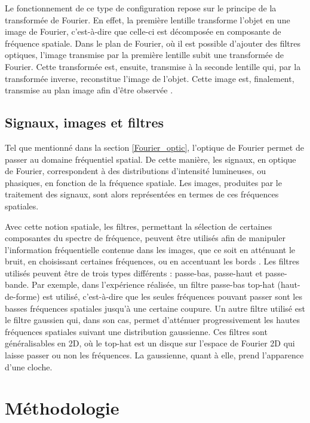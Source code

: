 \documentclass[11pt,letterpaper]{article}
\begin{document}
Le fonctionnement de ce type de configuration repose sur le principe de la transformée de Fourier. En effet, la première lentille transforme l'objet en une image de Fourier, c'est-à-dire que celle-ci est décomposée en composante de fréquence spatiale. Dans le plan de Fourier, où il est possible d'ajouter des filtres optiques, l'image transmise par la première lentille subit une transformée de Fourier. Cette transformée est, ensuite, transmise à la seconde lentille qui, par la transformée inverse, reconstitue l'image de l'objet. Cette image est, finalement, transmise au plan image afin d'être observée \cite{noauthor_fourier_2012}.

\subsection{Signaux, images et filtres}
Tel que mentionné dans la section \ref{Fourier_optic}, l'optique de Fourier permet de passer au domaine fréquentiel spatial. De cette manière, les signaux, en optique de Fourier, correspondent à des distributions d'intensité lumineuses, ou phasiques, en fonction de la fréquence spatiale. Les images, produites par le traitement des signaux, sont alors représentées en termes de ces fréquences spatiales.

Avec cette notion spatiale, les filtres, permettant la sélection de certaines composantes du spectre de fréquence, peuvent être utilisés afin de manipuler l'information fréquentielle contenue dans les images, que ce soit en atténuant le bruit, en choisissant certaines fréquences, ou en accentuant les bords \cite{noauthor_fourier_2024-2}. Les filtres utilisés peuvent être de trois types différents : passe-bas, passe-haut et passe-bande. Par exemple, dans l'expérience réalisée, un filtre passe-bas top-hat (haut-de-forme) est utilisé, c'est-à-dire que les seules fréquences pouvant passer sont les basses fréquences spatiales jusqu'à une certaine coupure. Un autre filtre utilisé est le filtre gaussien qui, dans son cas, permet d'atténuer progressivement les hautes fréquences spatiales suivant une distribution gaussienne. Ces filtres sont généralisables en 2D, où le top-hat est un disque sur l'espace de Fourier 2D qui laisse passer ou non les fréquences. La gaussienne, quant à elle, prend l'apparence d'une cloche.

\section{Méthodologie}
\end{document}
